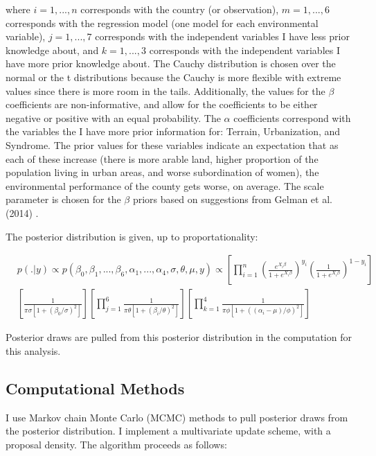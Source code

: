 \documentclass[letterpaper,10.5pt]{article}
\begin{document}
where $i=1,...,n$ corresponds with the country (or observation), $m=1,...,6$ corresponds with the regression model (one model for each environmental variable), $j=1,...,7$ corresponds with the independent variables I have less prior knowledge about, and $k=1,...,3$ corresponds with the independent variables I have more prior knowledge about. The Cauchy distribution is chosen over the normal or the t distributions because the Cauchy is more flexible with extreme values since there is more room in the tails. Additionally, the values for the $\beta$ coefficients are non-informative, and allow for the coefficients to be either negative or positive with an equal probability. The $\alpha$ coefficients correspond with the variables the I have more prior information for: Terrain, Urbanization, and Syndrome. The prior values for these variables indicate an expectation that as each of these increase (there is more arable land, higher proportion of the population living in urban areas, and worse subordination of women), the environmental performance of the county gets worse, on average. The scale parameter is chosen for the $\beta$ priors based on suggestions from Gelman et al. (2014) \cite{gelman}.

The posterior distribution is given, up to proportationality:

\begin{equation}
\begin{split}
&p(. | y) \propto 
p(\beta_0,\beta_1,...,\beta_6,\alpha_1,...,\alpha_4,\sigma,\theta,\mu, y) \propto  
\left[\prod_{i=1}^{n} \left(\frac{e^{X_i\beta}}{1+e^{X_i\beta}}\right)^{y_i} \left(\frac{1}{1+e^{X_i\beta}}\right)^{1-y_i}\right] \\
&\left[\frac{1}{\pi\sigma\left[1+\left(\beta_0/\sigma\right)^2\right]}\right] 
\left[\prod_{j=1}^{6}\frac{1}{\pi\theta\left[1+\left(\beta_i/\theta\right)^2\right]}\right] 
\left[\prod_{k=1}^{4}\frac{1}{\pi\phi\left[1+\left((\alpha_i-\mu)/{\phi}\right)^2\right]}\right] 
\end{split}
\end{equation}

Posterior draws are pulled from this posterior distribution in the computation for this analysis.

\subsection{Computational Methods}

I use Markov chain Monte Carlo (MCMC) methods to pull posterior draws from the posterior distribution. I implement a multivariate update scheme, with a proposal density. The algorithm proceeds as follows:
\end{document}
